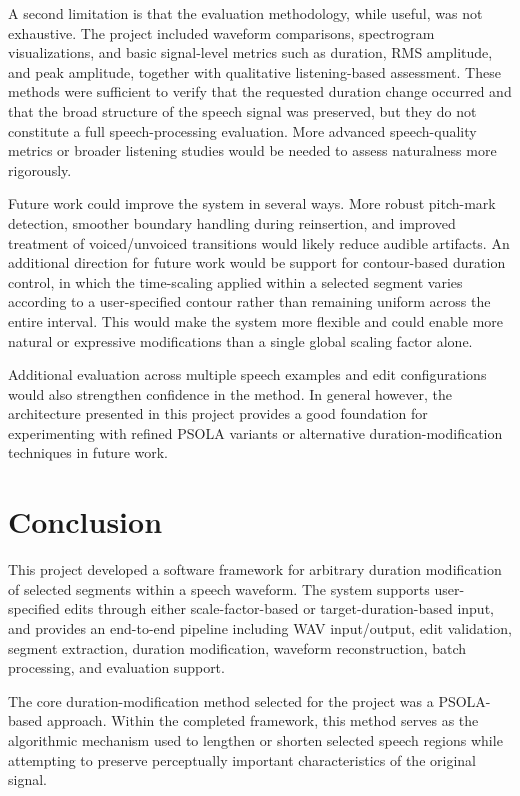 \documentclass{article}
\begin{document}
A second limitation is that the evaluation methodology, while useful, was not exhaustive. The project included waveform comparisons, spectrogram visualizations, and basic signal-level metrics such as duration, RMS amplitude, and peak amplitude, together with qualitative listening-based assessment. These methods were sufficient to verify that the requested duration change occurred and that the broad structure of the speech signal was preserved, but they do not constitute a full speech-processing evaluation. More advanced speech-quality metrics or broader listening studies would be needed to assess naturalness more rigorously.

Future work could improve the system in several ways. More robust pitch-mark detection, smoother boundary handling during reinsertion, and improved treatment of voiced/unvoiced transitions would likely reduce audible artifacts. An additional direction for future work would be support for contour-based duration control, in which the time-scaling applied within a selected segment varies according to a user-specified contour rather than remaining uniform across the entire interval. This would make the system more flexible and could enable more natural or expressive modifications than a single global scaling factor alone. 

Additional evaluation across multiple speech examples and edit configurations would also strengthen confidence in the method. In general however, the architecture presented in this project provides a good foundation for experimenting with refined PSOLA variants or alternative duration-modification techniques in future work.

\section{Conclusion}

This project developed a software framework for arbitrary duration modification of selected segments within a speech waveform. The system supports user-specified edits through either scale-factor-based or target-duration-based input, and provides an end-to-end pipeline including WAV input/output, edit validation, segment extraction, duration modification, waveform reconstruction, batch processing, and evaluation support.

The core duration-modification method selected for the project was a PSOLA-based approach. Within the completed framework, this method serves as the algorithmic mechanism used to lengthen or shorten selected speech regions while attempting to preserve perceptually important characteristics of the original signal.
\end{document}
